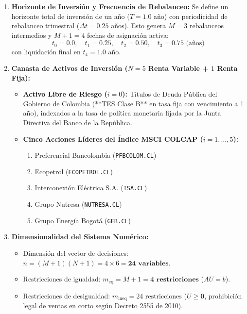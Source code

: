 \documentclass[11pt,a4paper]{report}
\numberwithin{equation}{chapter}
\begin{document}
\begin{enumerate}[leftmargin=2em]
    \item \textbf{Horizonte de Inversión y Frecuencia de Rebalanceo:}
    Se define un horizonte total de inversión de un año ($T = 1.0$ año) con periodicidad de rebalanceo trimestral ($\Delta t = 0.25$ años). Esto genera $M=3$ rebalanceos intermedios y $M+1=4$ fechas de asignación activa:
    \begin{equation}
        t_0 = 0.0, \quad t_1 = 0.25, \quad t_2 = 0.50, \quad t_3 = 0.75 \text{ (años)}
    \end{equation}
    con liquidación final en $t_4 = 1.0$ año.
    
    \item \textbf{Canasta de Activos de Inversión ($N=5$ Renta Variable + $1$ Renta Fija):}
    \begin{itemize}
        \item \textbf{Activo Libre de Riesgo ($i=0$):} Títulos de Deuda Pública del Gobierno de Colombia (**TES Clase B** en tasa fija con vencimiento a 1 año), indexados a la tasa de política monetaria fijada por la Junta Directiva del Banco de la República.
        \item \textbf{Cinco Acciones Líderes del Índice MSCI COLCAP ($i=1,\dots,5$):}
        \begin{enumerate}
            \item Preferencial Bancolombia (\texttt{PFBCOLOM.CL})
            \item Ecopetrol (\texttt{ECOPETROL.CL})
            \item Interconexión Eléctrica S.A. (\texttt{ISA.CL})
            \item Grupo Nutresa (\texttt{NUTRESA.CL})
            \item Grupo Energía Bogotá (\texttt{GEB.CL})
        \end{enumerate}
    \end{itemize}
    
    \item \textbf{Dimensionalidad del Sistema Numérico:}
    \begin{itemize}
        \item Dimensión del vector de decisiones: $n = (M+1)(N+1) = 4 \times 6 = \mathbf{24 \text{ variables}}$.
        \item Restricciones de igualdad: $m_{\mathrm{eq}} = M + 1 = \mathbf{4 \text{ restricciones}}$ ($AU = b$).
        \item Restricciones de desigualdad: $m_{\mathrm{ineq}} = 24 \text{ restricciones}$ ($U \ge \mathbf{0}$, prohibición legal de ventas en corto según Decreto 2555 de 2010).
    \end{itemize}
\end{enumerate}
\end{document}
